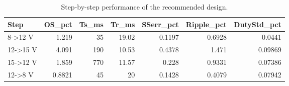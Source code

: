 \begin{table}[t]
\centering\caption{Step-by-step performance of the recommended design.}\label{tab:hwbest}
\begin{tabular}{lrrrrrr}
\toprule
Step & OS\_pct & Ts\_ms & Tr\_ms & SSerr\_pct & Ripple\_pct & DutyStd\_pct \\
\midrule
8->12 V & 1.219 & 35 & 19.02 & 0.1197 & 0.6928 & 0.0441 \\
12->15 V & 4.091 & 190 & 10.53 & 0.4378 & 1.471 & 0.09869 \\
15->12 V & 1.859 & 770 & 11.57 & 0.228 & 0.9331 & 0.07386 \\
12->8 V & 0.8821 & 45 & 20 & 0.1428 & 0.4079 & 0.07942 \\
\bottomrule
\end{tabular}
\end{table}
